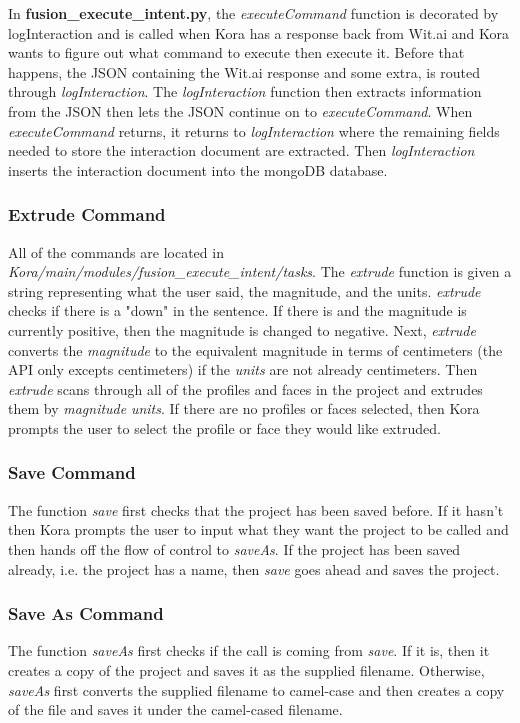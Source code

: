 \documentclass[onecolumn, draftclsnofoot,10pt, compsoc]{IEEEtran}
\begin{document}
In \textbf{fusion\_execute\_intent.py}, the \textit{executeCommand} function is decorated by logInteraction and is called when Kora has a response back from Wit.ai and Kora wants to figure out what command to execute then execute it. Before that happens, the JSON containing the Wit.ai response and some extra, is routed through \textit{logInteraction}. The \textit{logInteraction} function then extracts information from the JSON then lets the JSON continue on to \textit{executeCommand}. When \textit{executeCommand} returns, it returns to \textit{logInteraction} where the remaining fields needed to store the interaction document are extracted.
Then \textit{logInteraction} inserts the interaction document into the mongoDB database.

\subsubsection{Extrude Command}
All of the commands are located in \textit{Kora/main/modules/fusion\_execute\_intent/tasks}. The \textit{extrude} function is given a string representing what the user said, the magnitude, and the units.
\textit{extrude} checks if there is a "down" in the sentence. If there is and the magnitude is currently positive, then the magnitude is changed to negative. Next, \textit{extrude} converts the \textit{magnitude} to the equivalent magnitude in terms of centimeters (the API only excepts centimeters) if the \textit{units} are not already centimeters.
Then \textit{extrude} scans through all of the profiles and faces in the project and extrudes them by \textit{magnitude} \textit{units}. If there are no profiles or faces selected, then Kora prompts the user to select the profile or face they would like extruded.

\subsubsection{Save Command}
The function \textit{save} first checks that the project has been saved before. If it hasn't then Kora prompts the user to input what they want the project to be called and then hands off the flow of control to \textit{saveAs}. If the project has been saved already, i.e. the project has a name, then \textit{save} goes ahead and saves the project.

\subsubsection{Save As Command}
The function \textit{saveAs} first checks if the call is coming from \textit{save}. If it is, then it creates a copy of the project and saves it as the supplied filename. Otherwise, \textit{saveAs} first converts the supplied filename to camel-case and then creates a copy of the file and saves it under the camel-cased filename.
\end{document}
